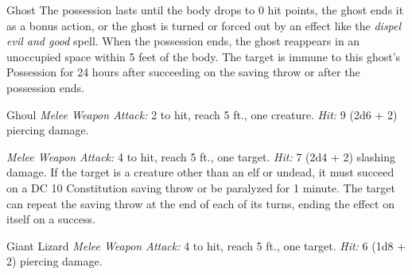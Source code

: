 \documentclass[10pt,a4paper,twoside,bg=print,twocolumn,openany,nodeprecatedcode]{dndbook}
\begin{document}
\begin{DndMonster}[float=t]{Ghost}
The possession lasts until the body drops to 0 hit points, the ghost ends it as a bonus action, or the ghost is turned or forced out by an effect like the \textit{dispel evil and good} spell. When the possession ends, the ghost reappears in an unoccupied space within 5 feet of the body. The target is immune to this ghost's Possession for 24 hours after succeeding on the saving throw or after the possession ends.

\end{DndMonster}



\begin{DndMonster}[float=t]{Ghoul}
\DndMonsterBasics[
armor-class = {12},
hit-points = {\DndDice{5d8}},
speed = {30 ft.}
]
\DndMonsterAbilityScores[
 str = 13,
 dex = 15,
 con = 10,
 int = 7,
 wis = 10,
 cha = 6
]
\DndMonsterDetails[
damage-immunities = {poison},
condition-immunities = {charmed, exhaustion, poisoned},
senses = {darkvision 60 ft., passive perception 10},
languages = {Common},
challenge = 1,
]
\textsl{Melee Weapon Attack:} 2 to hit, reach 5 ft., one creature. \textsl{Hit:} 9 (2d6 + 2) piercing damage.

\textsl{Melee Weapon Attack:} 4 to hit, reach 5 ft., one target. \textsl{Hit:} 7 (2d4 + 2) slashing damage. If the target is a creature other than an elf or undead, it must succeed on a DC 10 Constitution saving throw or be paralyzed for 1 minute. The target can repeat the saving throw at the end of each of its turns, ending the effect on itself on a success.

\end{DndMonster}



\begin{DndMonster}[float=t]{Giant Lizard}
\DndMonsterBasics[
armor-class = {12 (natural armor)},
hit-points = {\DndDice{3d10 + 3}},
speed = {30 ft., climb 30 ft.}
]
\DndMonsterAbilityScores[
 str = 15,
 dex = 12,
 con = 13,
 int = 2,
 wis = 10,
 cha = 5
]
\DndMonsterDetails[
senses = {darkvision 30 ft., passive perception 10},
challenge = 1/4,
]
\textsl{Melee Weapon Attack:} 4 to hit, reach 5 ft., one target. \textsl{Hit:} 6 (1d8 + 2) piercing damage.

\end{DndMonster}
\end{document}

